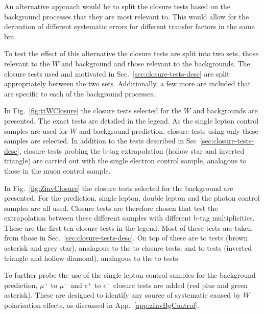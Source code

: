 An alternative approach would be to split the closure tests based on
the background processes that they are most relevant to. This would
allow for the derivation of different systematic errors for different
transfer factors in the same bin.

To test the effect of this alternative the closure tests are split into
two sets, those relevant to the $W$ and \ttbar background and those relevant
to the \znunu backgrounds. The closure tests used and motivated in
Sec.~\ref{sec:closure-tests-desc} are split appropriately between the
two sets. Additionally, a few more are included that are specific to each of
the background processes.

In Fig.~\ref{fig:ttWClosure} the closure tests selected for the $W$ and
\ttbar backgrounds are presented. The exact tests are detailed
in the legend. As the single lepton control samples are used for $W$ and
\ttbar background prediction, closure tests using only these samples
are selected. In addition to the tests described in
Sec~\ref{sec:closure-tests-desc}, closure tests probing the b-tag
extrapolation (hollow star and inverted triangle) are carried out with 
the single electron control sample, analagous to those in the muon control sample.

In Fig.~\ref{fig:ZinvClosure} the closure tests selected for the
\znunu background are presented. For the \znunu prediction, single
lepton, double lepton and the photon control samples are all used.
Closure tests are therefore chosen that test the extrapolation
between these different samples with different b-tag multiplicities. 
These are the first ten closure tests in the legend. Most of these
tests are taken from those in Sec.~\ref{sec:closure-tests-desc}. On top
of these are \mmj to \gj tests (brown asterisk and grey star), analagous to
the \eej to \gj closure tests, and \ej to \eej tests (inverted
triangle and hollow diamond), analagous to the \mj to \mmj tests.

To further probe the use of the single lepton control samples for the
\znunu background prediction, $\mu^+$ to $\mu^-$ and $e^+$ to $e^-$
closure tests are added (red plus and green asterisk). These are 
designed to identify any source of systematic caused by $W$ polarisation 
effects, as discussed in App.~\ref{app:zInvBgControl}.

